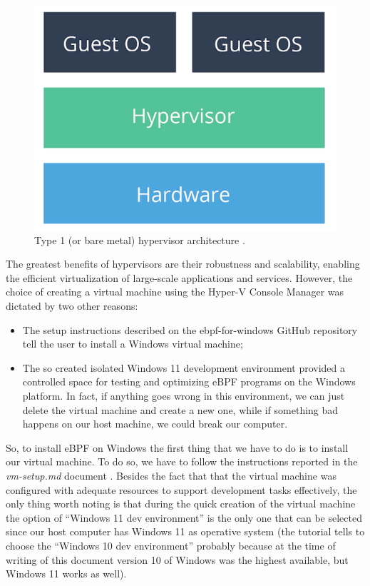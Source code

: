 \begin{figure}[h]
	\centering
	\includegraphics[width=0.7\linewidth]{images/Technologies/type_1_hypervisor.png}
	\caption{Type 1 (or bare metal) hypervisor architecture \cite{HypervisorsArchitectures}.}
	\label{fig:type_1_hypervisor}
\end{figure}

The greatest benefits of hypervisors are their robustness and scalability, enabling the efficient virtualization of large-scale applications and services.
However, the choice of creating a virtual machine using the Hyper-V Console Manager was dictated by two other reasons:

\begin{itemize}
	\item 
		The setup instructions described on the ebpf-for-windows GitHub repository tell the user to install a Windows virtual machine;
	\item 
		The so created isolated Windows 11 development environment provided a controlled space for testing and optimizing eBPF programs on the Windows platform.
		In fact, if anything goes wrong in this environment, we can just delete the virtual machine and create a new one, while if something bad happens on our host machine, we could break our computer.
\end{itemize}

So, to install eBPF on Windows the first thing that we have to do is to install our virtual machine.
To do so, we have to follow the instructions reported in the \textit{vm-setup.md} document \cite{WinVMSetupDoc}.
Besides the fact that that the virtual machine was configured with adequate resources to support development tasks effectively, the only thing worth noting is that during the quick creation of the virtual machine the option of ``Windows 11 dev environment'' is the only one that can be selected since our host computer has Windows 11 as operative system (the tutorial tells to choose the ``Windows 10 dev environment'' probably because at the time of writing of this document version 10 of Windows was the highest available, but Windows 11 works as well).  

